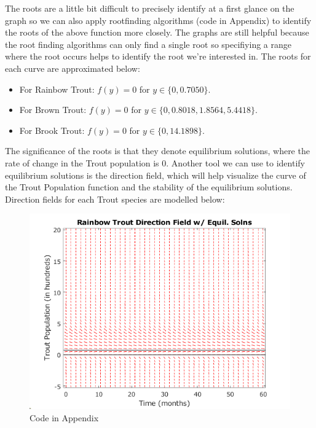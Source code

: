 \documentclass[letterpaper,12pt]{article}
\begin{document}
The roots are a little bit difficult to precisely identify at a first glance on the graph so we can also apply rootfinding algorithms (code in Appendix) to identify the roots of the above function more closely. 
The graphs are still helpful because the root finding algorithms can only find a single root so specifiying a range where the root occurs helps to identify the root we're interested in.
The roots for each curve are approximated below:
\begin{itemize}
    \item For Rainbow Trout: \(f(y) = 0\) for \(y \in \{0, 0.7050\}\).
    \item For Brown Trout: \(f(y) = 0\) for \(y \in \{0, 0.8018, 1.8564, 5.4418\}\).
    \item For Brook Trout: \(f(y) = 0\) for \(y \in \{0, 14.1898\}\).
\end{itemize}
The significance of the roots is that they denote equilibrium solutions, where the rate of change in the Trout population is 0.
Another tool we can use to identify equilibrium solutions is the direction field, which will help visualize the curve of the Trout Population function and the stability of the equilibrium solutions.
Direction fields for each Trout species are modelled below:
\begin{figure}[H]
    \centering
    \includegraphics{./figures/fig.3.4.4.png}
    \caption{Code in Appendix}
    \label{fig:4}
\end{figure}
\end{document}
